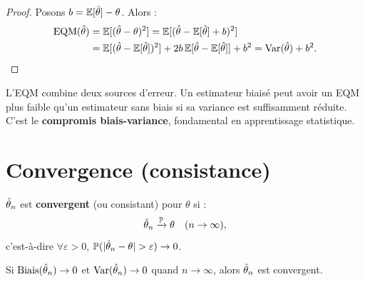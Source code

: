 \begin{proof}
Posons $b=\mathbb{E}[\hat{\theta}]-\theta$. Alors :
\begin{align*}
\operatorname{EQM}(\hat{\theta}) &= \mathbb{E}[(\hat{\theta}-\theta)^2] = \mathbb{E}[(\hat{\theta}-\mathbb{E}[\hat{\theta}]+b)^2] \\
&= \mathbb{E}[(\hat{\theta}-\mathbb{E}[\hat{\theta}])^2] + 2b\,\mathbb{E}[\hat{\theta}-\mathbb{E}[\hat{\theta}]] + b^2 = \operatorname{Var}(\hat{\theta})+b^2. \qedhere
\end{align*}
\end{proof}

\begin{intuition}
L'EQM combine deux sources d'erreur. Un estimateur biais\'e peut avoir un EQM plus faible qu'un estimateur sans biais si sa variance est suffisamment r\'eduite. C'est le \textbf{compromis biais-variance}, fondamental en apprentissage statistique.
\end{intuition}

\begin{center}
\end{center}

\section{Convergence (consistance)}

\begin{definition}
$\hat{\theta}_n$ est \textbf{convergent} (ou consistant) pour $\theta$ si :
\[
\hat{\theta}_n \xrightarrow{\mathbb{P}} \theta \quad (n\to\infty),
\]
c'est-\`a-dire $\forall\varepsilon>0$, $\Prob(|\thetahat_n-\theta|>\varepsilon)\to 0$.
\end{definition}

\begin{proposition}
\label{prop:consistance}
Si $\operatorname{Biais}(\hat{\theta}_n)\to 0$ et $\operatorname{Var}(\hat{\theta}_n)\to 0$ quand $n\to\infty$, alors $\hat{\theta}_n$ est convergent.
\end{proposition}

